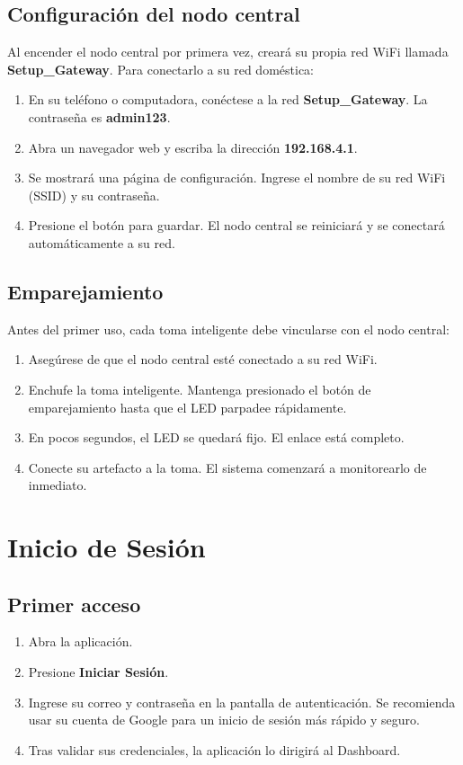 \documentclass[10pt,a4paper]{article}
\begin{document}
\subsection{Configuración del nodo central}
Al encender el nodo central por primera vez, creará su propia red WiFi llamada \textbf{Setup\_Gateway}. Para conectarlo a su red doméstica:

\begin{enumerate}
    \item En su teléfono o computadora, conéctese a la red \textbf{Setup\_Gateway}. La contraseña es \textbf{admin123}.
    \item Abra un navegador web y escriba la dirección \textbf{192.168.4.1}.
    \item Se mostrará una página de configuración. Ingrese el nombre de su red WiFi (SSID) y su contraseña.
    \item Presione el botón para guardar. El nodo central se reiniciará y se conectará automáticamente a su red.
\end{enumerate}

\subsection{Emparejamiento}
Antes del primer uso, cada toma inteligente debe vincularse con el nodo central:

\begin{enumerate}
    \item Asegúrese de que el nodo central esté conectado a su red WiFi.
    \item Enchufe la toma inteligente. Mantenga presionado el botón de emparejamiento hasta que el LED parpadee rápidamente.
    \item En pocos segundos, el LED se quedará fijo. El enlace está completo.
    \item Conecte su artefacto a la toma. El sistema comenzará a monitorearlo de inmediato.
\end{enumerate}

\section{Inicio de Sesión}

\subsection{Primer acceso}
\begin{enumerate}
    \item Abra la aplicación.
    \item Presione \textbf{Iniciar Sesión}.
    \item Ingrese su correo y contraseña en la pantalla de autenticación. Se recomienda usar su cuenta de Google para un inicio de sesión más rápido y seguro.
    \item Tras validar sus credenciales, la aplicación lo dirigirá al Dashboard.
\end{enumerate}
\end{document}

